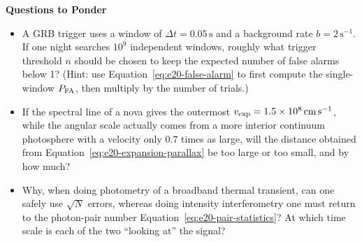 \medskip
\noindent\textbf{Questions to Ponder}
\begin{itemize}
  \item A GRB trigger uses a window of \(\Delta t=0.05\,\mathrm{s}\) and a background rate \(b=2\,\mathrm{s^{-1}}\). If one night searches \(10^{9}\) independent windows, roughly what trigger threshold \(n\) should be chosen to keep the expected number of false alarms below 1? (Hint: use Equation~\eqref{eq:e20-false-alarm} to first compute the single-window \(P_{\rm FA}\), then multiply by the number of trials.)
  \item If the spectral line of a nova gives the outermost \(v_{\rm exp}=1.5\times10^8\,\mathrm{cm\,s^{-1}}\), while the angular scale actually comes from a more interior continuum photosphere with a velocity only \(0.7\) times as large, will the distance obtained from Equation~\eqref{eq:e20-expansion-parallax} be too large or too small, and by how much?
  \item Why, when doing photometry of a broadband thermal transient, can one safely use \(\sqrt N\) errors, whereas doing intensity interferometry one must return to the photon-pair number Equation~\eqref{eq:e20-pair-statistics}? At which time scale is each of the two ``looking at'' the signal?
\end{itemize}
